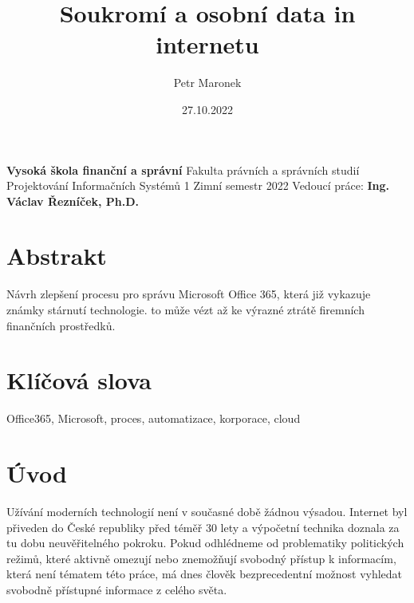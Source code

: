 \documentclass{article}
\title{Soukromí a osobní data in internetu}
\author{Petr Maronek}
\date{27.10.2022}
\begin{document}
	\begin{spacing}{1.15}
		\rmfamily
		\maketitle
		\begin{center}
			\textbf{Vysoká škola finanční a správní}\linebreak
			Fakulta právních a správních studií\linebreak
			Projektování Informačních Systémů 1\linebreak
			Zimní semestr 2022\linebreak
			Vedoucí práce: \textbf{Ing. Václav Řezníček, Ph.D.}
		\end{center}
		\pagebreak
			
		\section*{Abstrakt}
		Návrh zlepšení procesu pro správu Microsoft Office 365, která již vykazuje známky stárnutí technologie. to může vézt až ke výrazné ztrátě firemních finančních prostředků.
		 
		\section*{Klíčová slova}
		Office365, Microsoft, proces, automatizace, korporace, cloud
		\pagebreak
		    
		\section*{Úvod}
		Užívání moderních technologií není v současné době žádnou výsadou. Internet byl přiveden do České republiky před téměř 30 lety a výpočetní technika doznala za tu dobu neuvěřitelného pokroku. Pokud odhlédneme od problematiky politických režimů, které aktivně omezují nebo znemožňují svobodný přístup k informacím, která není tématem této práce, má dnes člověk bezprecedentní možnost vyhledat svobodně přístupné informace z celého světa.
		

\end{spacing}
\end{document}

